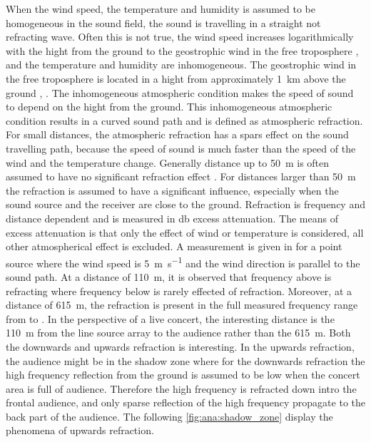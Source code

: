 When the wind speed, the temperature and humidity is assumed to be homogeneous in the sound field, the sound is travelling in a straight not refracting wave. Often this is not true, the wind speed increases logarithmically with the hight from the ground to the geostrophic wind \citep{asmos_acous_2016} in the free troposphere \citep{spr_hand_book}, and the temperature and humidity are inhomogeneous. The geostrophic wind in the free troposphere is located in a hight from approximately \SI{1}{\kilo\meter} above the ground \citep{spr_hand_book}, \citep{geostrophic_wind}. The inhomogeneous atmospheric condition makes the speed of sound to depend on the hight from the ground. This inhomogeneous atmospheric condition results in a curved sound path and is defined as atmospheric refraction. For small distances, the atmospheric refraction has a spars effect on the sound travelling path, because the speed of sound is much faster than the speed of the wind and the temperature change. Generally distance up to \SI{50}{\meter} is often assumed to have no significant refraction effect \citep{effect_of_wind}. For distances larger than \SI{50}{\meter} the refraction is assumed to have a significant influence, especially when the sound source and the receiver are close to the ground. Refraction is frequency and distance dependent and is measured in \si{\decibel} excess attenuation. The means of excess attenuation is that only the effect of wind or temperature is considered, all other atmospherical effect is excluded. A measurement is given in \citep{review_of_sound} for a point source where the wind speed is \SI{5}{\meter\per\second} and the wind direction is parallel to the sound path. At a distance of \SI{110}{\meter}, it is observed that frequency above  is refracting where frequency below is rarely effected of refraction. Moreover, at a distance of \SI{615}{\meter}, the refraction is present in the full measured frequency range from  to . In the perspective of a live concert, the interesting distance is the \SI{110}{\meter} from the line source array to the audience rather than the \SI{615}{\meter}. Both the downwards and upwards refraction is interesting. In the upwards refraction, the audience might be in the shadow zone where for the downwards refraction the high frequency reflection from the ground is assumed to be low when the concert area is full of audience. Therefore the high frequency is refracted down intro the frontal audience, and only sparse reflection of the high frequency propagate to the back part of the audience. The following \autoref{fig:ana:shadow_zone} display the phenomena of upwards refraction.


